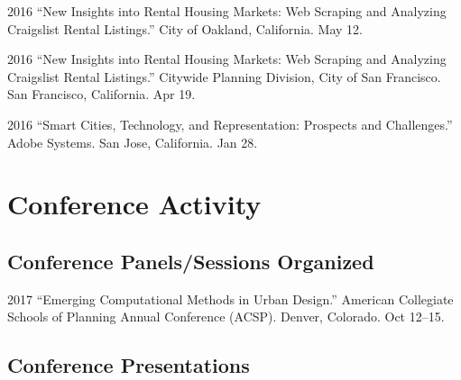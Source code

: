 \documentclass{academiccv}
\begin{document}
\begin{tablist}
\item[2016] \tab \enquote{New Insights into Rental Housing Markets: Web Scraping and Analyzing Craigslist Rental Listings.} City of Oakland, California. May 12.

\item[2016] \tab \enquote{New Insights into Rental Housing Markets: Web Scraping and Analyzing Craigslist Rental Listings.} Citywide Planning Division, City of San Francisco. San Francisco, California. Apr 19.

\item[2016] \tab \enquote{Smart Cities, Technology, and Representation: Prospects and Challenges.} Adobe Systems. San Jose, California. Jan 28.

\end{tablist}



\section*{Conference Activity}

\subsection*{Conference Panels/Sessions Organized}

\begin{tablist}
	
\item[2017] \tab \enquote{Emerging Computational Methods in Urban Design.} American Collegiate Schools of Planning Annual Conference (ACSP). Denver, Colorado. Oct 12--15.
	
\end{tablist}

\subsection*{Conference Presentations}
\end{document}
